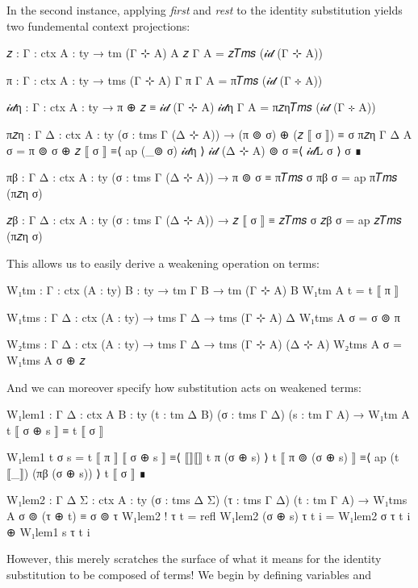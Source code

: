 In the second instance, applying \emph{first} and \emph{rest} to the identity
substitution yields two fundemental context projections:
\begin{code}
  𝑧 : {Γ : ctx} {A : ty} → tm (Γ ⊹ A) A
  𝑧 {Γ} {A} = 𝑧𝑇𝑚𝑠 (𝒾𝒹 (Γ ⊹ A))

  π : {Γ : ctx} {A : ty} → tms (Γ ⊹ A) Γ
  π {Γ} {A} = π𝑇𝑚𝑠 (𝒾𝒹 (Γ ⊹ A))
\end{code}
\begin{code}[hide]
  𝒾𝒹η : {Γ : ctx} {A : ty} → π ⊕ 𝑧 ≡ 𝒾𝒹 (Γ ⊹ A)
  𝒾𝒹η {Γ} {A} = π𝑧η𝑇𝑚𝑠 (𝒾𝒹 (Γ ⊹ A))

  π𝑧η : {Γ Δ : ctx} {A : ty} (σ : tms Γ (Δ ⊹ A)) →
    (π ⊚ σ) ⊕ (𝑧 ⟦ σ ⟧) ≡ σ
  π𝑧η {Γ} {Δ} {A} σ =
    π ⊚ σ ⊕ 𝑧 ⟦ σ ⟧
      ≡⟨ ap (_⊚ σ) 𝒾𝒹η ⟩
    𝒾𝒹 (Δ ⊹ A) ⊚ σ
      ≡⟨ 𝒾𝒹L σ ⟩
    σ
      ∎

  πβ : {Γ Δ : ctx} {A : ty} (σ : tms Γ (Δ ⊹ A)) →
    π ⊚ σ ≡ π𝑇𝑚𝑠 σ
  πβ σ = ap π𝑇𝑚𝑠 (π𝑧η σ)

  𝑧β : {Γ Δ : ctx} {A : ty} (σ : tms Γ (Δ ⊹ A)) →
    𝑧 ⟦ σ ⟧ ≡ 𝑧𝑇𝑚𝑠 σ
  𝑧β σ = ap 𝑧𝑇𝑚𝑠 (π𝑧η σ)
\end{code}
\noindent
This allows us to easily derive a weakening operation on terms:
\begin{code}
  W₁tm : {Γ : ctx} (A : ty) {B : ty} → tm Γ B → tm (Γ ⊹ A) B
  W₁tm A t = t ⟦ π ⟧
\end{code}
\begin{code}[hide]
  W₁tms : {Γ Δ : ctx} (A : ty) → tms Γ Δ → tms (Γ ⊹ A) Δ
  W₁tms A σ = σ ⊚ π

  W₂tms : {Γ Δ : ctx} (A : ty) → tms Γ Δ → tms (Γ ⊹ A) (Δ ⊹ A)
  W₂tms A σ = W₁tms A σ ⊕ 𝑧
\end{code}
\noindent
And we can moreover specify how substitution acts on weakened terms:
\begin{code}
  W₁lem1 : {Γ Δ : ctx} {A B : ty} (t : tm Δ B) (σ : tms Γ Δ) (s : tm Γ A) →
    W₁tm A t ⟦ σ ⊕ s ⟧ ≡ t ⟦ σ ⟧
\end{code}
\begin{code}[hide]
  W₁lem1 t σ s =
    t ⟦ π ⟧ ⟦ σ ⊕ s ⟧
      ≡⟨ ⟦⟧⟦⟧ t π (σ ⊕ s) ⟩
    t ⟦ π ⊚ (σ ⊕ s) ⟧
      ≡⟨ ap (t ⟦_⟧) (πβ (σ ⊕ s)) ⟩
    t ⟦ σ ⟧
      ∎

  W₁lem2 : {Γ Δ Σ : ctx} {A : ty} (σ : tms Δ Σ) (τ : tms Γ Δ) (t : tm Γ A) →
    W₁tms A σ ⊚ (τ ⊕ t) ≡ σ ⊚ τ
  W₁lem2 ! τ t = refl
  W₁lem2 (σ ⊕ s) τ t i = W₁lem2 σ τ t i ⊕ W₁lem1 s τ t i
\end{code}
However, this merely scratches the surface of what it means for the identity
substitution to be composed of terms! We begin by defining variables and
